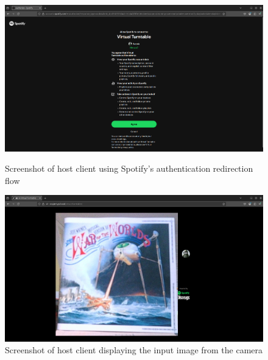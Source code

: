 \begin{uomappendix}
            \begin{figure}[H]
                \centering
                \begin{minipage}[b]{0.45\textwidth}
                    \centering
                    \includegraphics[width=\textwidth]{images/screenshots/HOST_Auth.png}
                    \caption{Screenshot of host client using Spotify's authentication redirection flow}
                    \label{fig:hostAuth}
                \end{minipage}
                \hfill
                \begin{minipage}[b]{0.45\textwidth}
                    \centering
                    \includegraphics[width=\textwidth]{images/screenshots/HOST_Cam.png}
                    \caption{Screenshot of host client displaying the input image from the camera}
                    \label{fig:hostCam}
                \end{minipage}
                
                \vspace{0.5cm}
                

\end{figure}
\end{uomappendix}
